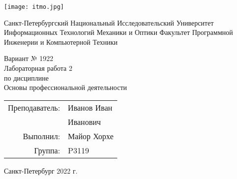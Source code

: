\newcommand{\teachername}{Иван}
\newcommand{\teacherpatronimic}{Иванович}
\newcommand{\teacherlastname}{Иванов}
\newcommand{\studentname}{Майор Хорхе}
\newcommand{\group}{P3119}
\newcommand{\variant}{1922}
\newcommand{\laboratorynumber}{2}
\newcommand{\subject}{Основы профессиональной деятельности}
\renewcommand{\date}{2022}

\begin{titlepage}
    \begin{center}
        {\texttt{[image: itmo.jpg]}\par}
        Санкт-Петербургский Национальный Исследовательский Университет Информационных
        Технологий Механики и Оптики Факультет Программной Инженерии и Компьютерной
        Техники\\
    \end{center}
    
    \vspace{\fill}
    
    \begin{center}
        Вариант № \variant\\
        Лабораторная работа \laboratorynumber\\
        по дисциплине\\
        \subject
    \end{center}
    
    \vspace{\fill}
    
    \begin{flushright}
        \begin{tabular}{ r l }
            Преподаватель:  & \teacherlastname{} \teachername \\
                            & \teacherpatronimic \\
            Выполнил:       & \studentname \\
            Группа:         & \group \\
        \end{tabular}
    \end{flushright}

    \vspace{1em}
	
	\begin{center}
		Санкт-Петербург \date{} г. \\
	\end{center}
\end{titlepage}